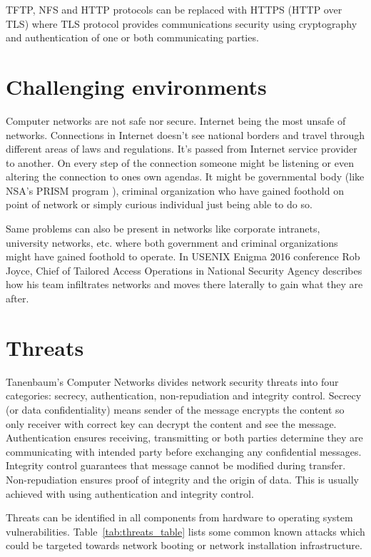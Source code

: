 TFTP, NFS and HTTP protocols can be replaced with HTTPS (HTTP over
TLS) where TLS protocol provides communications security using
cryptography and authentication of one or both communicating parties.


\section{Challenging environments}

Computer networks are not safe nor secure. Internet being the most
unsafe of networks. Connections in Internet doesn't see national
borders and travel through different areas of laws and regulations. It's passed from
Internet service provider to another. On every step of the connection
someone might be listening or even altering the connection to ones
own agendas. It might be governmental body (like NSA's PRISM
program \cite{nsa-prism}), criminal organization who have gained
foothold on point of network or simply curious individual just being
able to do so.

Same problems can also be present in networks like corporate
intranets, university networks, etc. where both government and
criminal organizations might have gained foothold to operate. In
USENIX Enigma 2016 conference Rob Joyce, Chief of Tailored Access
Operations in National Security Agency \cite{nsa-tao} describes how
his team infiltrates networks and moves there laterally to gain what
they are after.



\section{Threats}

Tanenbaum's Computer Networks\cite{Tanenbaum} divides network security
threats into four categories: secrecy, authentication, non-repudiation
and integrity control. Secrecy (or data confidentiality) means sender
of the message encrypts the content so only receiver with correct key
can decrypt the content and see the message. Authentication ensures
receiving, transmitting or both parties determine they are
communicating with intended party before exchanging any confidential
messages. Integrity control guarantees that message cannot be modified
during transfer. Non-repudiation ensures proof of integrity and the
origin of data. This is usually achieved with using authentication and
integrity control.

Threats can be identified in all components from hardware to
operating system vulnerabilities. Table~\ref{tab:threats_table} lists
some common known attacks which could be targeted towards network
booting or network installation infrastructure.

